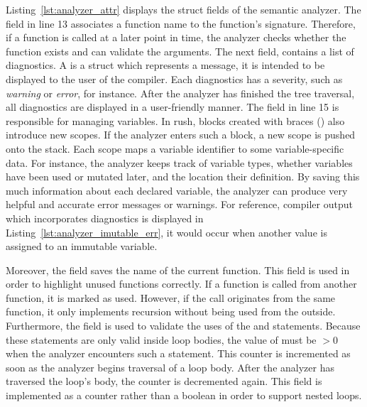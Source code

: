 Listing~\ref{lst:analyzer_attr} displays the struct fields of the semantic analyzer.
The field  in line 13 associates a function name to the function's signature.
Therefore, if a function is called at a later point in time, the analyzer checks whether the function exists and can validate the arguments.
The next field,  contains a list of diagnostics.
A  is a struct which represents a message, it is intended to be displayed to the user of the compiler.
Each diagnostics has a severity, such as \emph{warning} or \emph{error}, for instance.
After the analyzer has finished the tree traversal, all diagnostics are displayed in a user-friendly manner.
The  field in line 15 is responsible for managing variables.
In rush, blocks created with braces (\qVerb{\{\}}) also introduce new scopes.
If the analyzer enters such a block, a new scope is pushed onto the  stack.
Each scope maps a variable identifier to some variable-specific data.
For instance, the analyzer keeps track of variable types, whether variables have been used or mutated later, and the location their definition.
By saving this much information about each declared variable, the analyzer can produce very helpful and accurate error messages or warnings.
For reference, compiler output which incorporates diagnostics is displayed in Listing~\ref{lst:analyzer_imutable_err},
it would occur when another value is assigned to an immutable variable.


Moreover, the field  saves the name of the current function.
This field is used in order to highlight unused functions correctly.
If a function is called from another function, it is marked as used.
However, if the call originates from the same function, it only implements recursion without being used from the outside.
Furthermore, the  field is used to validate the uses of the  and  statements.
Because these statements are only valid inside loop bodies, the value of  must be $> 0$ when the analyzer encounters such a statement.
This counter is incremented as soon as the analyzer begins traversal of a loop body.
After the analyzer has traversed the loop's body, the counter is decremented again.
This field is implemented as a counter rather than a boolean in order to support nested loops.

